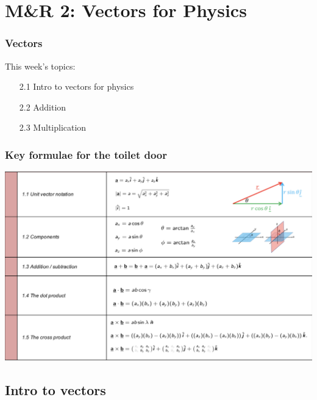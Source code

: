  

\section{M\&R 2: Vectors for Physics}
\begin{frame}
\frametitle{Vectors} 
\normalsize

This week's topics:\\[3ex]

\begin{itemize}
\item[2.1] Intro to vectors for physics\\[3ex]
\item[2.2] Addition\\[3ex]
\item[2.3] Multiplication\\[3ex]
\end{itemize}
\end{frame} 
 
 \begin{frame}
\frametitle{Key formulae for the toilet door}

\includegraphics[scale=0.34]{keyf-vectors}
\end{frame}

 \subsection{Intro to vectors}

